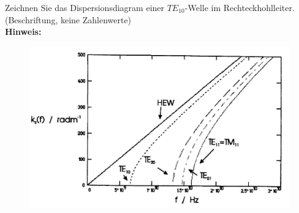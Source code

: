 \begin{question}[section=6,name={Dispersionsdiagram},difficulty=,quantity=1,type=thr,tags={}]
	Zeichnen Sie das Dispersionsdiagram einer $TE_{10}$-Welle im Rechteckhohlleiter.(Beschriftung, keine Zahlenwerte)
	\\ \textbf{Hinweis:}\\
	
\end{question}
\begin{solution}
	\begin{figure}[H]
		\includegraphics[width=14cm]{./opn/exm/thr/chp/6/1/bild.jpeg}
	\end{figure}
\end{solution}
